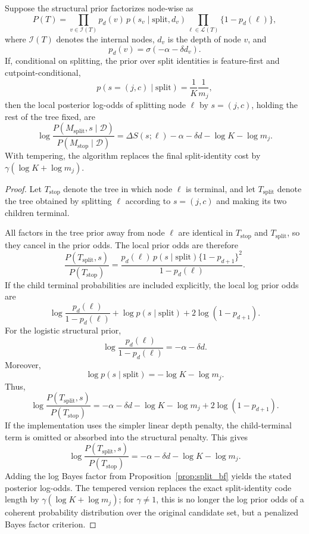 \begin{proposition}
\label{prop:local_posterior_odds}
Suppose the structural prior factorizes node-wise as
\[
P(T)
=
\prod_{v\in\mathcal{I}(T)}
p_d(v)\,p(s_v\mid \mathrm{split},d_v)
\prod_{\ell\in\mathcal{L}(T)}
\{1-p_d(\ell)\},
\]
where $\mathcal{I}(T)$ denotes the internal nodes, $d_v$ is the depth of node $v$, and
\[
p_d(v)
=
\sigma(-\alpha-\delta d_v).
\]
If, conditional on splitting, the prior over split identities is feature-first and cutpoint-conditional,
\[
p(s=(j,c)\mid \mathrm{split})
=
\frac{1}{K}\frac{1}{m_j},
\]
then the local posterior log-odds of splitting node $\ell$ by $s=(j,c)$, holding the rest of the tree fixed, are
\[
\log
\frac{
P(M_{\mathrm{split}},s\mid\mathcal{D})
}{
P(M_{\mathrm{stop}}\mid\mathcal{D})
}
=
\Delta S(s;\ell)
-
\alpha
-
\delta d
-
\log K
-
\log m_j .
\]
With tempering, the algorithm replaces the final split-identity cost by
$\gamma(\log K+\log m_j)$.
\end{proposition}

\begin{proof}
Let $T_{\mathrm{stop}}$ denote the tree in which node $\ell$ is terminal, and let $T_{\mathrm{split}}$ denote the tree obtained by splitting $\ell$ according to $s=(j,c)$ and making its two children terminal.

All factors in the tree prior away from node $\ell$ are identical in $T_{\mathrm{stop}}$ and $T_{\mathrm{split}}$, so they cancel in the prior odds. The local prior odds are therefore
\[
\frac{
P(T_{\mathrm{split}},s)
}{
P(T_{\mathrm{stop}})
}
=
\frac{
p_d(\ell)\,p(s\mid\mathrm{split})\{1-p_{d+1}\}^2
}{
1-p_d(\ell)
}.
\]
If the child terminal probabilities are included explicitly, the local log prior odds are
\[
\log\frac{p_d(\ell)}{1-p_d(\ell)}
+
\log p(s\mid\mathrm{split})
+
2\log(1-p_{d+1}).
\]
For the logistic structural prior,
\[
\log\frac{p_d(\ell)}{1-p_d(\ell)}
=
-\alpha-\delta d.
\]
Moreover,
\[
\log p(s\mid\mathrm{split})
=
-\log K-\log m_j.
\]
Thus,
\[
\log
\frac{
P(T_{\mathrm{split}},s)
}{
P(T_{\mathrm{stop}})
}
=
-\alpha-\delta d-\log K-\log m_j
+
2\log(1-p_{d+1}).
\]
If the implementation uses the simpler linear depth penalty, the child-terminal term is omitted or absorbed into the structural penalty. This gives
\[
\log
\frac{
P(T_{\mathrm{split}},s)
}{
P(T_{\mathrm{stop}})
}
=
-\alpha-\delta d-\log K-\log m_j.
\]
Adding the log Bayes factor from Proposition~\ref{prop:split_bf} yields the stated posterior log-odds. The tempered version replaces the exact split-identity code length by
$\gamma(\log K+\log m_j)$; for $\gamma\ne1$, this is no longer the log prior odds of a coherent probability distribution over the original candidate set, but a penalized Bayes factor criterion.
\end{proof}


